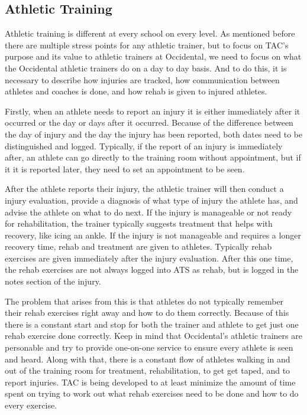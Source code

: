\documentclass[10pt,twocolumn]{article}
\begin{document}
\subsection{Athletic Training}
Athletic training is different at every school on every level. As mentioned before there are multiple stress points for any athletic trainer, but to focus on TAC's purpose and its value to athletic trainers at Occidental, we need to focus on what the Occidental athletic trainers do on a day to day basis. And to do this, it is necessary to describe how injuries are tracked, how communication between athletes and coaches is done, and how rehab is given to injured athletes.

Firstly, when an athlete needs to report an injury it is either immediately after it occurred or the day or days after it occurred. Because of the difference between the day of injury and the day the injury has been reported, both dates need to be distinguished and logged. Typically, if the report of an injury is immediately after, an athlete can go directly to the training room without appointment, but if it it is reported later, they need to set an appointment to be seen. 

After the athlete reports their injury, the athletic trainer will then conduct a injury evaluation, provide a diagnosis of what type of injury the athlete has, and advise the athlete on what to do next. If the injury is manageable or not ready for rehabilitation, the trainer typically suggests treatment that helps with recovery, like icing an ankle. If the injury is not manageable and requires a longer recovery time, rehab and treatment are given to athletes. Typically rehab exercises are given immediately after the injury evaluation. After this one time, the rehab exercises are not always logged into ATS as rehab, but is logged in the notes section of the injury.

The problem that arises from this is that athletes do not typically remember their rehab exercises right away and how to do them correctly. Because of this there is a constant start and stop for both the trainer and athlete to get just one rehab exercise done correctly. Keep in mind that Occidental's athletic trainers are personable and try to provide one-on-one service to ensure every athlete is seen and heard. Along with that, there is a constant flow of athletes walking in and out of the training room for treatment, rehabilitation, to get get taped, and to report injuries. TAC is being developed to at least minimize the amount of time spent on trying to work out what rehab exercises need to be done and how to do every exercise.
\end{document}
